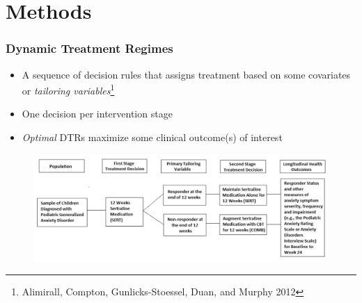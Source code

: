 \documentclass[xcolor=dvipsnames]{beamer}
\begin{document}
\section{Methods}
\begin{frame}
\frametitle{Dynamic Treatment Regimes}
\begin{itemize}
	\item A sequence of decision rules that assigns treatment based on some covariates or \textit{tailoring variables}\footnote[frame]{Alimirall, Compton, Gunlicks-Stoessel, Duan, and Murphy 2012}
	\item One decision per intervention stage
	\item \textit{Optimal} DTRs maximize some clinical outcome(s) of interest
\end{itemize}
\vfill 
\begin{figure}[h!]
	\centering
	\includegraphics[scale=0.5]{EmbeddedRegime.png}
\end{figure}
\end{frame}
\end{document}
